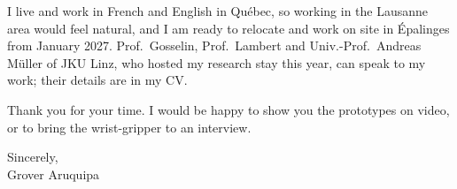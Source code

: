 \documentclass[11pt,a4paper]{article}
\begin{document}
I live and work in French and English in Qu\'ebec, so working in the Lausanne area would feel natural, and I am ready to relocate and work on site in \'Epalinges from January 2027. Prof.\ Gosselin, Prof.\ Lambert and Univ.-Prof.\ Andreas M\"uller of JKU Linz, who hosted my research stay this year, can speak to my work; their details are in my CV.

Thank you for your time. I would be happy to show you the prototypes on video, or to bring the wrist-gripper to an interview.

Sincerely,\\
Grover Aruquipa
\end{document}
